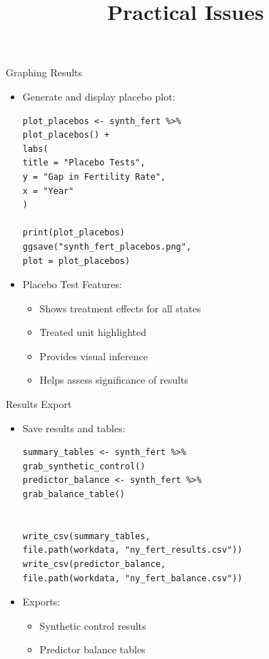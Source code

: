 \documentclass[hyperref={pdfpagelabels=false}]{beamer}
\begin{document}
\begin{frame}[fragile]{Graphing Results}
\begin{itemize}
\item Generate and display placebo plot:
\vspace{0.2cm}
\begin{lstlisting}
plot_placebos <- synth_fert %>%
plot_placebos() +
labs(
title = "Placebo Tests",
y = "Gap in Fertility Rate",
x = "Year"
)

print(plot_placebos)
ggsave("synth_fert_placebos.png", 
plot = plot_placebos)
\end{lstlisting}
\item Placebo Test Features:
\begin{itemize}
	\item Shows treatment effects for all states
	\item Treated unit highlighted
	\item Provides visual inference
	\item Helps assess significance of results
\end{itemize}
\end{itemize}
\end{frame}

\begin{frame}[fragile]{Results Export}
\begin{itemize}
\item Save results and tables:
\vspace{0.2cm}
\begin{lstlisting}
summary_tables <- synth_fert %>%
grab_synthetic_control()
predictor_balance <- synth_fert %>%
grab_balance_table()


write_csv(summary_tables, 
file.path(workdata, "ny_fert_results.csv"))
write_csv(predictor_balance, 
file.path(workdata, "ny_fert_balance.csv"))
\end{lstlisting}
\item Exports:
\begin{itemize}
\item Synthetic control results
\item Predictor balance tables
\end{itemize}
\end{itemize}
\end{frame}









\title[]  
{Practical Issues}
\end{document}
